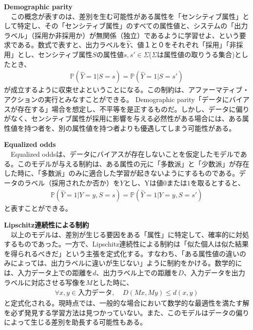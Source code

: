 \documentclass[b5j,twoside,twocolumn]{utarticle}
\begin{document}
\textbf{Demographic parity\cite{hardt2016equality}}\\
~~この概念が表すのは、差別を生む可能性がある属性を「センシティブ属性」として特定し、その「センシティブ属性」のすべての属性値と、システムの「出力ラベル」（採用か非採用か）が無関係（独立）であるように学習せよ、という要求である。数式で表すと、出力ラベルを$\hat{Y}$、値１と０をそれぞれ「採用」「非採用」とし、センシティブ属性$S$の属性値$s, s' \in \Sigma$($\Sigma$は属性値の取りうる集合)としたとき、
\begin{eqnarray}
\mathbb{P}(\hat{Y} = 1|S=s) =  \mathbb{P}(\hat{Y} = 1|S=s')
\end{eqnarray}
が成立するように収束せよということになる。この制約は、アファーマティブ・アクションの実行とみなすことができる\cite{mouzannar2018fair}。
Demographic parity「データにバイアスが存在する」場合を想定し、不平等を是正するものだ。しかし、データに偏りがなく、センシティブ属性が採用に影響を与える必然性がある場合には、ある属性値を持つ者を、別の属性値を持つ者よりも優遇してしまう可能性がある。

\textbf{Equalized odds\cite{hardt2016equality}}\\
~~Equalized oddsは、データにバイアスが存在しないことを仮定したモデルである。このモデルが与える制約は、ある属性の元に「多数派」と「少数派」が存在した時に、「多数派」のみに適合した学習が起きないようにするものである。データのラベル（採用されたか否か）を$Y$とし、Yは値$0または1$を取るとすると、
\begin{eqnarray}
\mathbb{P}(\hat{Y} = 1|Y=y, S=s) =  \mathbb{P}(\hat{Y} = 1|Y=y, S=s')
\end{eqnarray}
と表すことができる。


\textbf{Lipschitz連続性による制約\cite{dwork2011fairness}}\\
~~以上のモデルは、差別が生じる要因をある「属性」に特定して、確率的に対処するものであった。一方で、Lipschitz連続性による制約は「似た個人は似た結果を得られるべきだ」という主張を定式化する。すなわち、「ある属性値の違いのみによっては、出力ラベルに違いが生じない」ように制約をかける。数学的には、入力データ上での距離を$d$、出力ラベル上での距離を$D$、入力データを出力ラベルに対応させる写像を$M$とした時に、\\
\begin{eqnarray}
\forall x, y \in 入力データ,~~~~~D(Mx, My) \leq d(x, y)
\end{eqnarray}
と定式化される。現時点では、一般的な場合において数学的な最適性を満たす解を必ず発見する学習方法は見つかっていない。また、このモデルはデータの偏りによって生じる差別を助長する可能性もある。
\end{document}
